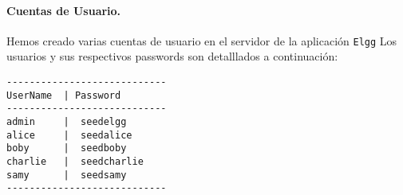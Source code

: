 

\paragraph{Cuentas de Usuario.}
Hemos creado varias cuentas de usuario en el servidor de la aplicación {\tt Elgg}
Los usuarios y sus respectivos passwords son detalllados a continuación:


\begin{lstlisting}
----------------------------
UserName  | Password
----------------------------
admin     |  seedelgg
alice     |  seedalice 
boby      |  seedboby 
charlie   |  seedcharlie 
samy      |  seedsamy 
----------------------------
\end{lstlisting}




